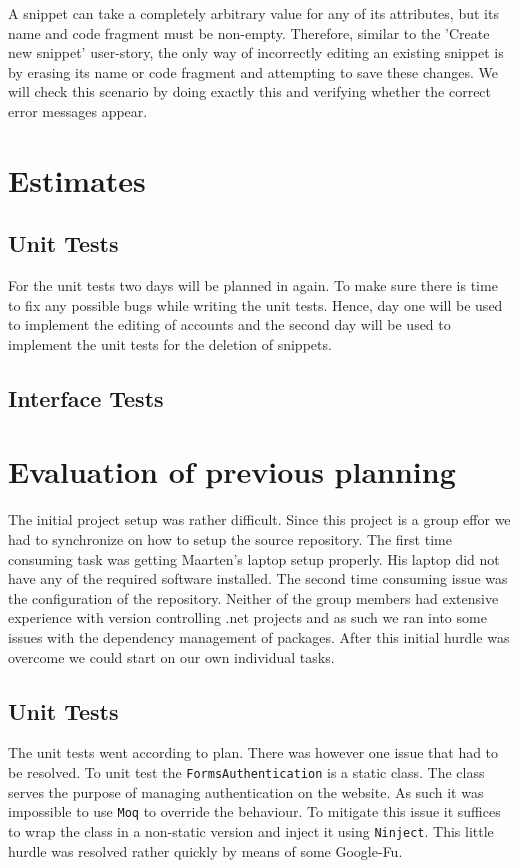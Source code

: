 \documentclass[10pt,a4paper,BCOR12mm, headexclude, footexclude,
  twoside, openright]{scrartcl}
\numberwithin{equation}{section} %
\numberwithin{figure}{section} %
\numberwithin{table}{section} %
\begin{document}
A snippet can take a completely arbitrary value for any of its attributes, but its name and code fragment must be non-empty.
Therefore, similar to the 'Create new snippet' user-story, the only way of incorrectly editing an existing snippet is by erasing its name or code fragment and attempting to save these changes.
We will check this scenario by doing exactly this and verifying whether the correct error messages appear.


\section{Estimates}
\subsection{Unit Tests}
For the unit tests two days will be planned in again. To make sure there is time
to fix any possible bugs while writing the unit tests. Hence, day one will be
used to implement the editing of accounts and the second day will be used to
implement the unit tests for the deletion of snippets.
\subsection{Interface Tests}

\section{Evaluation of previous planning}
The initial project setup was rather difficult. Since this project is a group
effor we had to synchronize on how to setup the source repository. The first
time consuming task was getting Maarten's laptop setup properly. His laptop did
not have any of the required software installed. The second time consuming issue
was the configuration of the repository. Neither of the group members had
extensive experience with version controlling .net projects and as such we ran
into some issues with the dependency management of packages. After this initial
hurdle was overcome we could start on our own individual tasks.

\subsection{Unit Tests}
The unit tests went according to plan. There was however one issue that had to
be resolved. To unit test the \texttt{FormsAuthentication} is a static
class. The class serves the purpose of managing authentication on the
website. As such it was impossible to use \texttt{Moq} to override the
behaviour. To mitigate this issue it suffices to wrap the class in a non-static
version and inject it using \texttt{Ninject}. This little hurdle was resolved
rather quickly by means of some Google-Fu.
\end{document}
